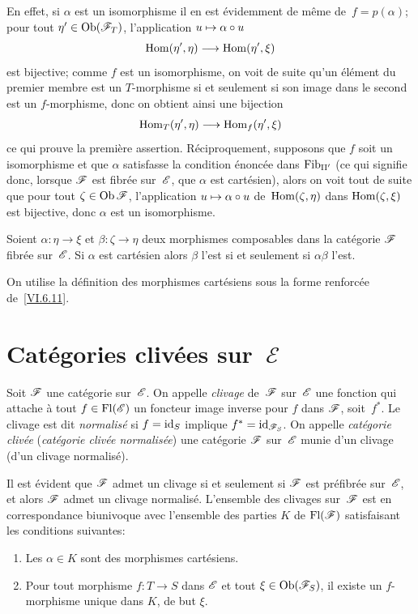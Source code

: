 En effet, si $\alpha$ est un isomorphisme il en est \'evidemment de
m\^eme de~$f=p(\alpha)$; pour tout
$\eta'\in\Ob(\cal{F}_T)$,
l'application $u\mto \alpha\circ u$
$$
\Hom(\eta',\eta)\to \Hom(\eta',\xi)
$$
est bijective; comme $f$ est un isomorphisme, on voit de suite
qu'un
\'el\'ement du premier membre est un $T$-morphisme si et seulement
si son image dans le second est un $f$-morphisme, donc on obtient
ainsi une bijection
$$
\Hom_T(\eta',\eta)\to\Hom_f(\eta',\xi)
$$
ce
qui prouve la premi\`ere assertion. R\'eciproquement, supposons
que $f$ soit un isomorphisme et que $\alpha$ satisfasse la condition
\'enonc\'ee dans $\mathrm{Fib}_{\mathrm{II}'}$ (ce qui signifie donc,
lorsque $\cal{F}$ est
fibr\'ee
sur~$\cal{E}$, que $\alpha$ est cart\'esien), alors on voit tout de
suite que pour tout $\zeta\in\Ob\cal{F}$, l'application $u\mto
\alpha\circ u$ de~$\operatorname{Hom}(\zeta,\eta)$ dans $\operatorname{Hom}(\zeta,\xi)$ est
bijective, donc $\alpha$ est un isomorphisme.
\begin{corollaire}
\label{VI.6.13} Soient $\alpha\colon\eta\to\xi$ et
$\beta\colon\zeta\to \eta$ deux morphismes composables dans la
cat\'egorie $\cal{F}$ fibr\'ee sur~$\cal{E}$. Si $\alpha$ est
cart\'esien alors $\beta$ l'est si et seulement si $\alpha\beta$
l'est.
\end{corollaire}

On utilise la d\'efinition des morphismes cart\'esiens sous la
forme renforc\'ee de~\ref{VI.6.11}.

\section{Cat\'egories cliv\'ees sur~$\mathcal{E}$}
\label{VI.7}

\begin{definition}
\label{VI.7.1} Soit $\cal{F}$ une cat\'egorie sur~$\cal{E}$. On
appelle \emph{clivage}
de~$\cal{F}$ sur~$\cal{E}$ une fonction qui attache \`a tout
$f\in\Fl(\cal{E})$ un foncteur image inverse pour $f$ dans $\cal{F}$,
soit~$f^*$. Le clivage est dit \emph{normalisé}
si $f=\mathrm{id}_S$ implique $f^*=\id_{\cal{F}_S}$. On appelle
\emph{catégorie clivée} (\resp \emph{catégorie clivée
normalisée})
une cat\'egorie $\cal{F}$ sur~$\cal{E}$ munie d'un clivage
(\resp d'un clivage normalis\'e).
\end{definition}

Il est \'evident que $\cal{F}$ admet un clivage si et seulement si
$\cal{F}$ est pr\'efibr\'ee sur~$\cal{E}$, et alors $\cal{F}$
admet un clivage normalis\'e. L'ensemble des clivages sur~$\cal{F}$
est en correspondance biunivoque avec l'ensemble des parties $K$ de
$\Fl(\cal{F})$ satisfaisant les conditions suivantes:
\begin{enumerate}
\item[a)] Les $\alpha\in K$ sont des morphismes cart\'esiens.
\item[b)] Pour tout morphisme $f\colon T\to S$ dans $\cal{E}$ et tout
$\xi\in\Ob(\cal{F}_S)$, il existe un $f$-morphisme unique dans $K$, de
but $\xi$.
\end{enumerate}

